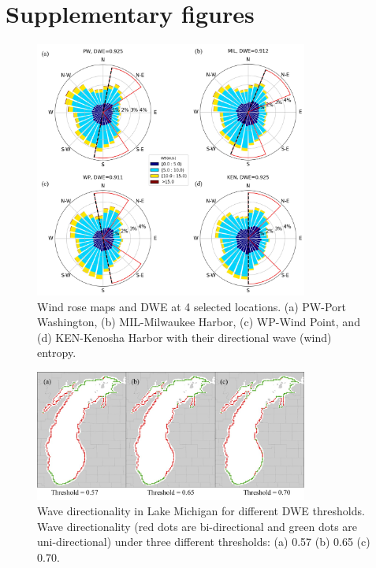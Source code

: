 

\chapter{Supplementary figures}
\label{Supplementary figures}
\begin{figure}[htbp]
  \centering
  \includegraphics[width=0.8\textwidth]{appendix/resources/figure3-1a.jpg}
  \caption{Wind rose maps and DWE at 4 selected locations. (a) PW-Port Washington, (b) MIL-Milwaukee Harbor, (c) WP-Wind Point, and (d) KEN-Kenosha Harbor with their directional wave (wind) entropy.}
  \label{fig:fig3.1a}
\end{figure}

\begin{figure}[htbp]
  \centering
  \includegraphics[width=0.8\textwidth]{appendix/resources/figure3-2a.jpg}
  \caption{Wave directionality in Lake Michigan for different DWE thresholds. Wave directionality (red dots are bi-directional and green dots are uni-directional) under three different thresholds: (a) 0.57 (b) 0.65 (c) 0.70.}
  \label{fig:fig3.2a}
\end{figure}

